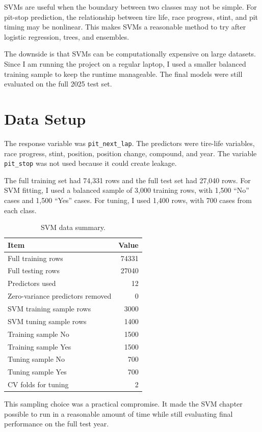 \documentclass[11pt,oneside,openany]{book}
\begin{document}
SVMs are useful when the boundary between two classes may not be simple. For pit-stop prediction, the relationship between tire life, race progress, stint, and pit timing may be nonlinear. This makes SVMs a reasonable method to try after logistic regression, trees, and ensembles.

The downside is that SVMs can be computationally expensive on large datasets. Since I am running the project on a regular laptop, I used a smaller balanced training sample to keep the runtime manageable. The final models were still evaluated on the full 2025 test set.

\section{Data Setup}

The response variable was \texttt{pit\_next\_lap}. The predictors were tire-life variables, race progress, stint, position, position change, compound, and year. The variable \texttt{pit\_stop} was not used because it could create leakage.

The full training set had 74,331 rows and the full test set had 27,040 rows. For SVM fitting, I used a balanced sample of 3,000 training rows, with 1,500 ``No'' cases and 1,500 ``Yes'' cases. For tuning, I used 1,400 rows, with 700 cases from each class.

\begin{table}[H]
\centering
\small
\caption{SVM data summary.}
\begin{tabular}{lr}
\toprule
Item & Value\\
\midrule
Full training rows & 74331\\
Full testing rows & 27040\\
Predictors used & 12\\
Zero-variance predictors removed & 0\\
SVM training sample rows & 3000\\
SVM tuning sample rows & 1400\\
Training sample No & 1500\\
Training sample Yes & 1500\\
Tuning sample No & 700\\
Tuning sample Yes & 700\\
CV folds for tuning & 2\\
\bottomrule
\end{tabular}
\end{table}

This sampling choice was a practical compromise. It made the SVM chapter possible to run in a reasonable amount of time while still evaluating final performance on the full test year.
\end{document}
